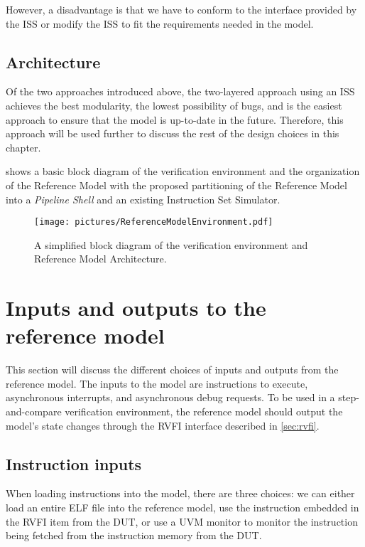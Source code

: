 However, a disadvantage is that we have to conform to the interface provided by the ISS or modify the ISS to fit the requirements needed in the model.

\subsection{Architecture}

Of the two approaches introduced above, the two-layered approach using an ISS achieves the best modularity, the lowest possibility of bugs, and is the easiest approach to ensure that the model is up-to-date in the future. Therefore, this approach will be used further to discuss the rest of the design choices in this chapter.

 shows a basic block diagram of the verification environment and the organization of the Reference Model with the proposed partitioning of the Reference Model into a \textit{Pipeline Shell} and an existing Instruction Set Simulator. 

\begin{figure}[ht]
    \centering
    \texttt{[image: pictures/ReferenceModelEnvironment.pdf]}
    \caption{A simplified block diagram of the verification environment and Reference Model Architecture.}
    \label{fig:env-block-diagram}
\end{figure}

\section{Inputs and outputs to the reference model}
\label{sec:inOut}

This section will discuss the different choices of inputs and outputs from the reference model. The inputs to the model are instructions to execute, asynchronous interrupts, and asynchronous debug requests. To be used in a step-and-compare verification environment, the reference model should output the model's state changes through the RVFI interface described in \cref{sec:rvfi}. 

\subsection{Instruction inputs}

When loading instructions into the model, there are three choices: 
we can either load an entire ELF file into the reference model, 
use the instruction embedded in the RVFI item from the DUT, 
or use a UVM monitor to monitor the instruction being fetched from the instruction memory from the DUT.

